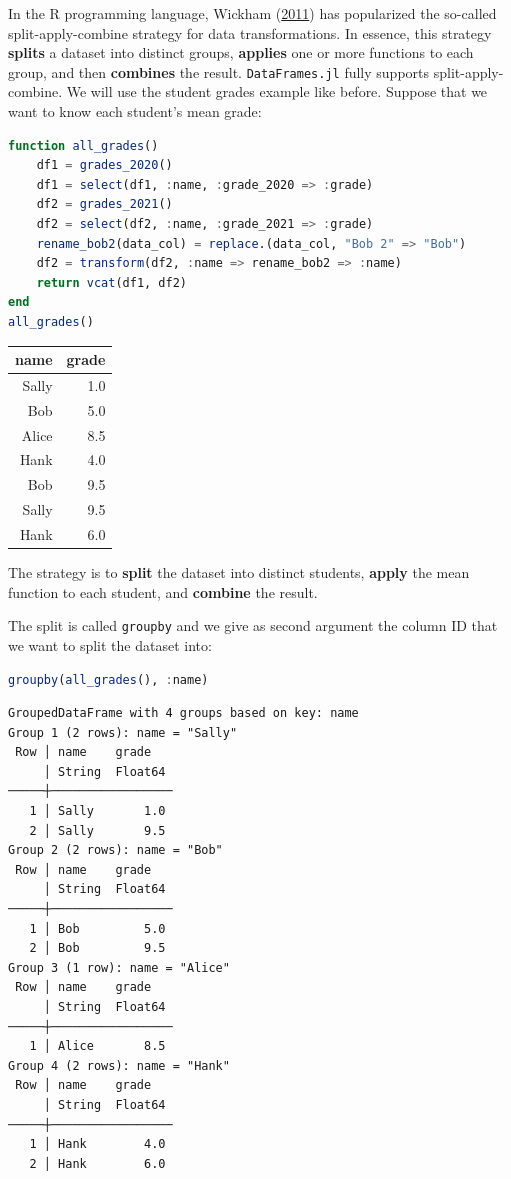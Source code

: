 \documentclass[
  notoc %
]{tufte-book}
\newcommand{\passthrough}[1]{#1}
\begin{document}
In the R programming language, Wickham
(\protect\hyperlink{ref-wickham2011split}{2011}) has popularized the
so-called split-apply-combine strategy for data transformations. In
essence, this strategy \textbf{splits} a dataset into distinct groups,
\textbf{applies} one or more functions to each group, and then
\textbf{combines} the result. \passthrough{\lstinline!DataFrames.jl!}
fully supports split-apply-combine. We will use the student grades
example like before. Suppose that we want to know each student's mean
grade:

\begin{lstlisting}[language=Julia]
function all_grades()
    df1 = grades_2020()
    df1 = select(df1, :name, :grade_2020 => :grade)
    df2 = grades_2021()
    df2 = select(df2, :name, :grade_2021 => :grade)
    rename_bob2(data_col) = replace.(data_col, "Bob 2" => "Bob")
    df2 = transform(df2, :name => rename_bob2 => :name)
    return vcat(df1, df2)
end
all_grades()
\end{lstlisting}

\begin{longtable}[]{@{}rr@{}}
\toprule()
name & grade \\
\midrule()
\endhead
Sally & 1.0 \\
Bob & 5.0 \\
Alice & 8.5 \\
Hank & 4.0 \\
Bob & 9.5 \\
Sally & 9.5 \\
Hank & 6.0 \\
\bottomrule()
\end{longtable}

The strategy is to \textbf{split} the dataset into distinct students,
\textbf{apply} the mean function to each student, and \textbf{combine}
the result.

The split is called \passthrough{\lstinline!groupby!} and we give as
second argument the column ID that we want to split the dataset into:

\begin{lstlisting}[language=Julia]
groupby(all_grades(), :name)
\end{lstlisting}

\begin{lstlisting}
GroupedDataFrame with 4 groups based on key: name
Group 1 (2 rows): name = "Sally"
 Row │ name    grade
     │ String  Float64
─────┼─────────────────
   1 │ Sally       1.0
   2 │ Sally       9.5
Group 2 (2 rows): name = "Bob"
 Row │ name    grade
     │ String  Float64
─────┼─────────────────
   1 │ Bob         5.0
   2 │ Bob         9.5
Group 3 (1 row): name = "Alice"
 Row │ name    grade
     │ String  Float64
─────┼─────────────────
   1 │ Alice       8.5
Group 4 (2 rows): name = "Hank"
 Row │ name    grade
     │ String  Float64
─────┼─────────────────
   1 │ Hank        4.0
   2 │ Hank        6.0
\end{lstlisting}
\end{document}
